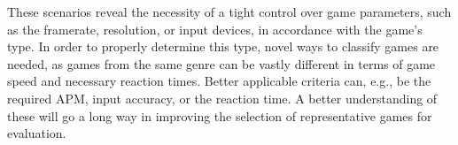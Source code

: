 These scenarios reveal the necessity of a tight control over game parameters, such as the framerate, resolution, or input devices, in accordance with the game's type. In order to properly determine this type, novel ways to classify games are needed, as games from the same genre can be vastly different in terms of game speed and necessary reaction times. Better applicable criteria can, e.g., be the required \gls{APM}, input accuracy, or the reaction time. A better understanding of these will go a long way in improving the selection of representative games for evaluation.




